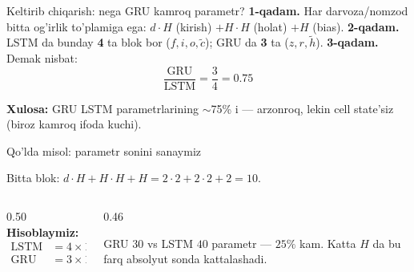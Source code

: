 \documentclass[aspectratio=169,11pt]{beamer}
\begin{document}
\begin{frame}{Keltirib chiqarish: nega GRU kamroq parametr?}
  \textbf{1-qadam.} Har darvoza/nomzod bitta og'irlik to'plamiga ega:
  $d{\cdot}H$ (kirish) $+ H{\cdot}H$ (holat) $+ H$ (bias).
  \pause
  \textbf{2-qadam.} LSTM da bunday \textbf{4} ta blok bor ($f,i,o,\tilde{c}$); GRU da
  \textbf{3} ta ($z,r,\tilde{h}$).
  \pause
  \textbf{3-qadam.} Demak nisbat:
  $$ \frac{\text{GRU}}{\text{LSTM}} = \frac{3}{4} = 0.75 $$
  \begin{tcolorbox}[okbox,top=2pt,bottom=2pt]
    \small \textbf{Xulosa:} GRU LSTM parametrlarining $\sim$75\% i --- arzonroq,
    lekin cell state'siz (biroz kamroq ifoda kuchi).
  \end{tcolorbox}
\end{frame}

\begin{frame}{Qo'lda misol: parametr sonini sanaymiz}
  \begin{tcolorbox}[defbox,title={Kichik model: $d=2$, $H=2$}]
    \small Bitta blok: $d{\cdot}H + H{\cdot}H + H = 2{\cdot}2 + 2{\cdot}2 + 2 = 10$.
  \end{tcolorbox}
  \vspace{0.2em}
  \begin{columns}[T]
    \begin{column}{0.50\textwidth}
      \textbf{Hisoblaymiz:}
      \begin{align*}
        \text{LSTM} &= 4\times 10 = \mathbf{40}\\
        \text{GRU}  &= 3\times 10 = \mathbf{30}
      \end{align*}
    \end{column}
    \begin{column}{0.46\textwidth}
      \begin{tcolorbox}[okbox,top=2pt,bottom=2pt]
        \footnotesize
        GRU $30$ vs LSTM $40$ parametr --- $25\%$ kam. Katta $H$ da bu farq
        absolyut sonda kattalashadi.
      \end{tcolorbox}
    \end{column}
  \end{columns}
\end{frame}
\end{document}
